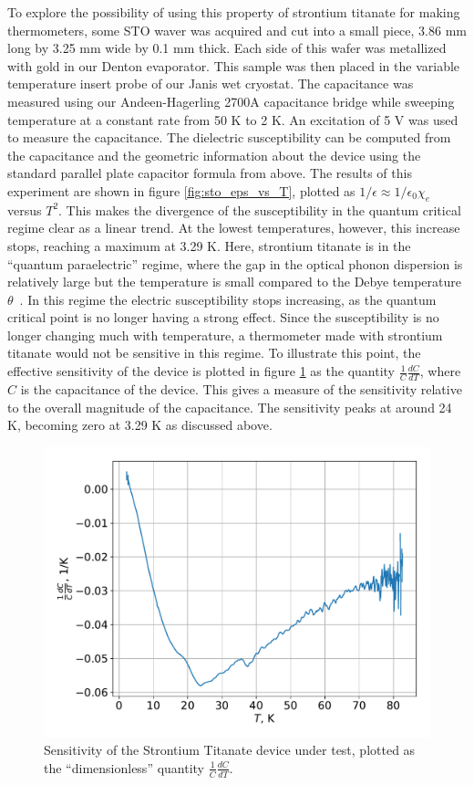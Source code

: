 \documentclass{thesis-umich}
\begin{document}
 To explore the possibility of using this property of strontium titanate for making thermometers, some STO waver was acquired and cut into a small piece, 3.86 mm long by 3.25 mm wide by 0.1 mm thick. Each side of this wafer was metallized with gold in our Denton evaporator. This sample was then placed in the variable temperature insert probe of our Janis wet cryostat. The capacitance was measured using our Andeen-Hagerling 2700A capacitance bridge while sweeping temperature at a constant rate from 50 K to 2 K. An excitation of 5 V was used to measure the capacitance. The dielectric susceptibility can be computed from the capacitance and the geometric information about the device using the standard parallel plate capacitor formula from above. The results of this experiment are shown in figure \ref{fig:sto_eps_vs_T}, plotted as $1/\epsilon \approx 1/\epsilon_0 \chi_e$ versus $T^2$. This makes the divergence of the susceptibility in the quantum critical regime clear as a linear trend. At the lowest temperatures, however, this increase stops, reaching a maximum at 3.29 K. Here, strontium titanate is in the ``quantum paraelectric'' regime, where the gap in the optical phonon dispersion is relatively large but the temperature is small compared to the Debye temperature $\theta$~\cite{RowleyThesis}. In this regime the electric susceptibility stops increasing, as the quantum critical point is no longer having a strong effect. Since the susceptibility is no longer changing much with temperature, a thermometer made with strontium titanate would not be sensitive in this regime. To illustrate this point, the effective sensitivity of the device is plotted in figure \ref{fig:sto_sens_vs_t} as the quantity $\frac{1}{C}\frac{dC}{dT}$, where $C$ is the capacitance of the device. This gives a measure of the sensitivity relative to the overall magnitude of the capacitance. The sensitivity peaks at around 24 K, becoming zero at 3.29 K as discussed above.

\begin{figure}
\caption[Sensitivity of STO test device]{Sensitivity of the Strontium Titanate device under test, plotted as the ``dimensionless'' quantity \(\frac{1}{C} \frac{dC}{dT}\).}
	\label{fig:sto_sens_vs_t}
	\includegraphics[width=\columnwidth]{figures/STO_dCdT_vs_T.pdf}
\end{figure}
\end{document}
